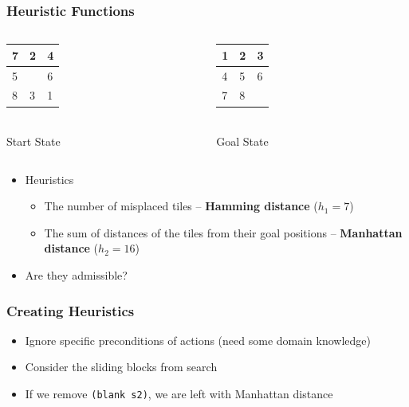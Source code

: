 \documentclass{beamer}
\begin{document}
\newcommand\puzzle[9]{
			{\Large
			\begin{tabular}{|m{.5em}|m{.5em}|m{.5em}|}
			\hline
			#1 & #2 & #3\\
			\hline
			#4 & #5 & #6\\
			\hline
			#7 & #8 & #9\\
			\hline
			\end{tabular}
			}
}

	\begin{frame}[c]\frametitle{Heuristic Functions}
		\begin{columns}
		\begin{column}{0.5\textwidth}
			\begin{center}
				\puzzle{7}{2}{4}
				       {5}{ }{6} 
				       {8}{3}{1}\\[1em]
				Start State
			\end{center}
		\end{column}
		\begin{column}{0.5\textwidth}
			\begin{center}
				\puzzle{1}{2}{3}
				       {4}{5}{6} 
				       {7}{8}{ }\\[1em]
				Goal State
			\end{center}
		\end{column}
		\end{columns}
		\begin{itemize}
			\item Heuristics
			\begin{itemize}
				\item<2-> The number of misplaced tiles -- \textbf{Hamming distance} ($h_1 = 7$)
				\item<2-> The sum of distances of the tiles from their goal positions -- \textbf{Manhattan distance} ($h_2 = 16$)  
			\end{itemize}
			\item<2-> Are they admissible?
		\end{itemize}
	\end{frame}

	\begin{frame}[c]\frametitle{Creating Heuristics}
		\begin{itemize}
			\item Ignore specific preconditions of actions (need some domain knowledge)
			\item Consider the sliding blocks from search
		\end{itemize}
		
		\begin{itemize}
			\item If we remove \texttt{(blank s2)}, we are left with Manhattan distance
		\end{itemize}
	\end{frame}
	
\end{document}
